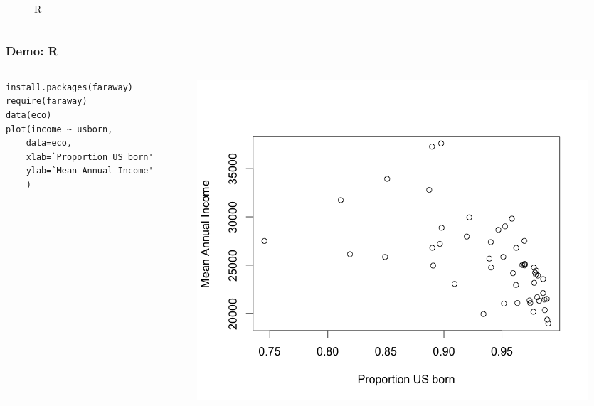 \documentclass[hyperref={colorlinks=false},compress,handout,10pt]{beamer}
\begin{document}
\begin{frame}[fragile]
\begin{columns}
\begin{column}{0.5\textwidth}
\begin{figure}
                        \caption{R}
            \end{figure}
        \end{column}
    \end{columns} 
\end{frame}

\begin{frame}[fragile]
    \frametitle{Demo: R}
    \begin{columns}
        \begin{column}{0.5\textwidth}
    \begin{lstlisting}
install.packages(faraway)
require(faraway)
data(eco)
plot(income ~ usborn, 
    data=eco,
    xlab=`Proportion US born'
    ylab=`Mean Annual Income'
    )
    \end{lstlisting}
        \end{column}
        \begin{column}{0.5\textwidth}
            \includegraphics[width=\textwidth]{FigureFarawayFigure11dot1.png}
        \end{column}
    \end{columns} 
\end{frame}
\end{document}
